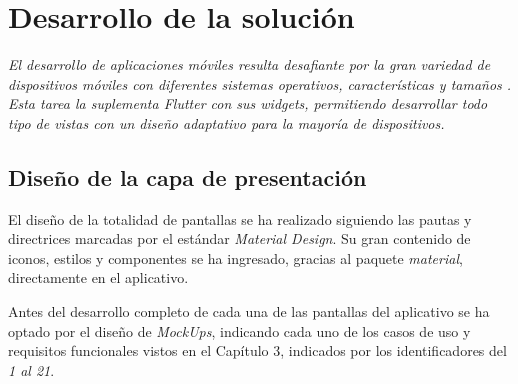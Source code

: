 \chapter{Desarrollo de la solución}
\textit{El desarrollo de aplicaciones móviles resulta desafiante por la gran variedad de dispositivos
móviles con diferentes sistemas operativos, características y tamaños \cite{7021823}. Esta tarea
la suplementa Flutter con sus widgets, permitiendo
desarrollar todo tipo de vistas con un diseño adaptativo para la mayoría de dispositivos.
}

\section{Diseño de la capa de presentación}
El diseño de la totalidad de pantallas se ha realizado siguiendo las pautas y directrices marcadas por
el estándar \textit{Material Design}. Su gran contenido de iconos, estilos y componentes se ha ingresado,
gracias al paquete \textit{material}, directamente en el aplicativo.

Antes del desarrollo completo de cada una de las pantallas del aplicativo se ha optado por el diseño de
\textit{MockUps}, indicando cada uno de los casos de uso y requisitos funcionales vistos en el Capítulo 
3, indicados por los identificadores del \textit{1 al 21}.


